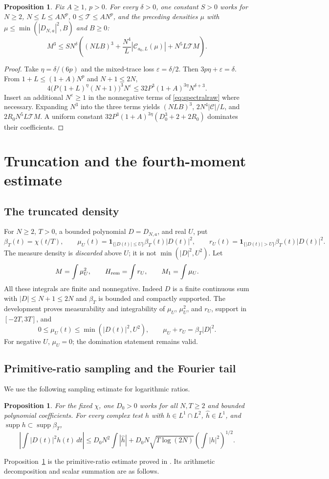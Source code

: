 \documentclass[11pt,a4paper,oneside]{article}
\newtheorem{proposition}[theorem]{Proposition}
\theoremstyle{definition}
\newcommand{\eps}{\varepsilon}
\newcommand{\one}{\mathbf 1}
\newcommand{\supp}{\operatorname{supp}}
\newcommand{\Hhat}{\widehat}
\numberwithin{equation}{section}
\begin{document}
\begin{proposition}\label{prop:spectralscale}
Fix $A\ge1$, $p>0$. For every $\delta>0$, one constant $S>0$ works for
$N\ge2$, $N\le L\le AN^p$, $0\le\mathcal T\le AN^p$, and the preceding
densities $\mu$ with $\mu\le\min(|D_{N,a}|^2,B)$ and $B\ge0$:
\begin{equation*}
 M^3\le SN^\delta\left((NLB)^3+\frac{N^4}{L}|\mathcal C_{a_0,L}(\mu)|
                         +N^5L\mathcal T M\right).
\end{equation*}
\end{proposition}
\begin{proof}
Take $\eta=\delta/(6p)$ and the mixed-trace loss $\eps=\delta/2$.
Then $3p\eta+\eps=\delta$. From
$1+L\le(1+A)N^p$ and $N+1\le2N$,
\[
 4\bigl(P(1+L)^\eta(N+1)\bigr)^3N^\eps
 \le32P^3(1+A)^{3\eta}N^{\delta+3}.
\]
Insert an additional $N^\eps\ge1$ in the nonnegative terms of
\eqref{eq:spectralraw} where necessary. Expanding $N^3$ into the three
terms yields $(NLB)^3$, $2N^4|\mathcal C|/L$, and
$2R_0N^5L\mathcal TM$. A uniform constant
$32P^3(1+A)^{3\eta}(D_0^3+2+2R_0)$ dominates their coefficients.
\end{proof}
\section{Truncation and the fourth-moment estimate}\label{ch:moment}
\subsection{The truncated density}
For $N\ge2$, $T>0$, a bounded polynomial $D=D_{N,a}$, and real $U$, put
\[
 \beta_T(t)=\chi(t/T),\qquad
 \mu_U(t)=\one_{\{|D(t)|\le U\}}\beta_T(t)|D(t)|^2,\qquad
 r_U(t)=\one_{\{|D(t)|>U\}}\beta_T(t)|D(t)|^2.
\]
The measure density is \emph{discarded} above $U$; it is not
$\min(|D|^2,U^2)$. Let
\[
 M=\int\mu_U^2,\qquad H_{\rm rem}=\int r_U,\qquad M_1=\int\mu_U.
\]
All these integrals are finite and nonnegative. Indeed $D$ is a finite
continuous sum with $|D|\le N+1\le2N$ and $\beta_T$ is bounded and
compactly supported. The development proves measurability and integrability of
$\mu_U$, $\mu_U^2$, and $r_U$, support in $[-2T,3T]$, and
\[
 0\le\mu_U(t)\le\min(|D(t)|^2,U^2),\qquad
 \mu_U+r_U=\beta_T|D|^2.
\]
For negative $U$, $\mu_U=0$; the domination statement remains valid.
\subsection{Primitive-ratio sampling and the Fourier tail}
We use the following sampling estimate for logarithmic ratios.
\begin{proposition}\label{input:sampling}
For the fixed $\chi$, one $D_0>0$ works for all $N,T\ge2$ and bounded
polynomial coefficients. For every complex test $h$ with $h\in L^1\cap L^2$,
$\Hhat h\in L^1$, and $\supp h\subset\supp\beta_T$,
\[
 \left|\int |D(t)|^2h(t)\,dt\right|
 \le D_0N^2\int|\Hhat h|+
      D_0N\sqrt{T\log(2N)}\left(\int|h|^2\right)^{1/2}.
\]
\end{proposition}
Proposition~\ref{input:sampling} is the primitive-ratio estimate proved in \cite{Lewko}. Its arithmetic decomposition and scalar summation are as follows.
\end{document}
